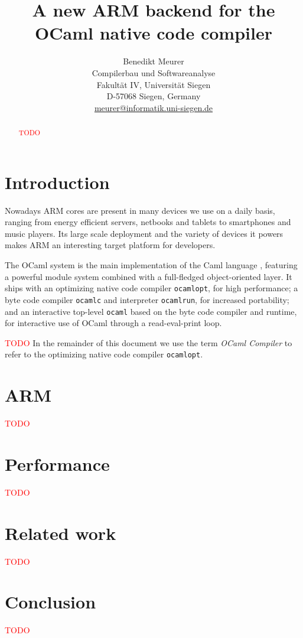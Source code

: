 \documentclass[10pt,a4paper,final,twocolumn]{article}
\begin{document}
\title{%
  A new ARM backend for the OCaml native code compiler
}
\author{%
  Benedikt Meurer \\
  Compilerbau und Softwareanalyse \\
  Fakult\"at IV, Universit\"at Siegen \\
  D-57068 Siegen, Germany \\
  \url{meurer@informatik.uni-siegen.de}
}
\date{}

\maketitle

\begin{abstract}
  \textcolor{red}{TODO}
\end{abstract}


\section{Introduction}

Nowadays ARM cores are present in many devices we use on a daily basis, ranging from energy efficient servers,
netbooks and tablets to smartphones and music players. Its large scale deployment and the variety of devices
it powers makes ARM an interesting target platform for developers.

The OCaml \cite{Leroy11,Remy02} system is the main implementation of the Caml language \cite{Caml11}, featuring
a powerful module system combined with a full-fledged object-oriented layer. It ships with an optimizing native
code compiler \texttt{ocamlopt}, for high performance; a byte code compiler \texttt{ocamlc} and interpreter
\texttt{ocamlrun}, for increased portability; and an interactive top-level \texttt{ocaml} based on the byte code
compiler and runtime, for interactive use of OCaml through a read-eval-print loop.

\textcolor{red}{TODO} In the remainder of this document we use the term \emph{OCaml Compiler} to refer to the
optimizing native code compiler \texttt{ocamlopt}.


\section{ARM} \label{section:ARM}

\textcolor{red}{TODO}


\section{Performance} \label{section:Performance}

\textcolor{red}{TODO}


\section{Related work} \label{section:Related_work}

\textcolor{red}{TODO}


\section{Conclusion} \label{section:Conclusion}

\textcolor{red}{TODO}




\end{document}
